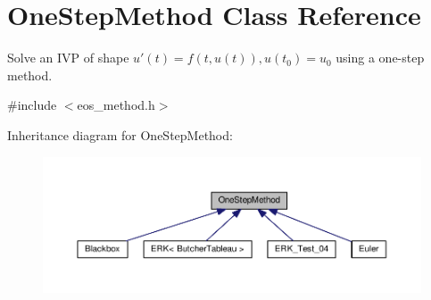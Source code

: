 \hypertarget{classOneStepMethod}{}\section{One\+Step\+Method Class Reference}
\label{classOneStepMethod}


Solve an I\+VP of shape $u'(t) = f(t, u(t)), u(t_0) = u_0$ using a one-\/step method.  




{\ttfamily \#include $<$eos\+\_\+method.\+h$>$}



Inheritance diagram for One\+Step\+Method\+:\nopagebreak
\begin{figure}[H]
\begin{center}
\leavevmode
\includegraphics[width=350pt]{classOneStepMethod__inherit__graph}
\end{center}
\end{figure}
